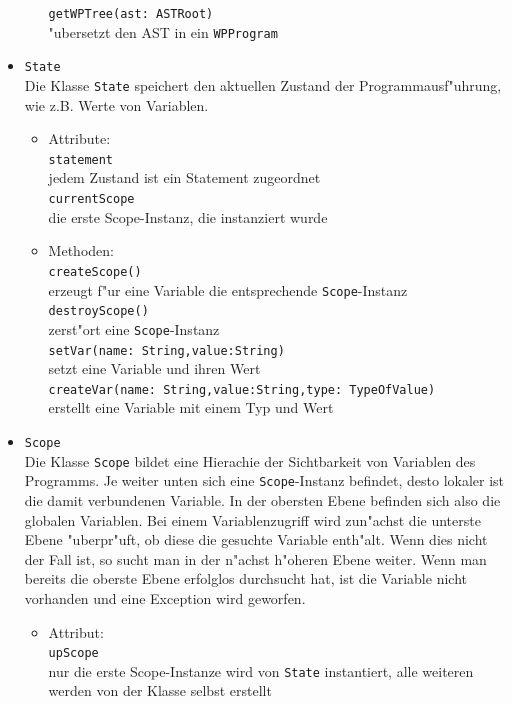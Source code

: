 \documentclass[10pt,a4paper,titlepage]{article}
\begin{document}
\begin{itemize}
\begin{itemize}
\texttt{getWPTree(ast: ASTRoot)} \\
"ubersetzt den AST in ein \texttt{WPProgram}
\end{itemize}
\item \texttt{State} \\
Die Klasse \texttt{State} speichert den aktuellen Zustand der Programmausf"uhrung, wie z.B. Werte von Variablen.
\begin{itemize}
\item Attribute: \\
\texttt{statement} \\
jedem Zustand ist ein Statement zugeordnet \\
\texttt{currentScope} \\
die erste Scope-Instanz, die instanziert wurde
\item Methoden: \\
\texttt{createScope()} \\
erzeugt f"ur eine Variable die entsprechende \texttt{Scope}-Instanz \\
\texttt{destroyScope()} \\
zerst"ort eine \texttt{Scope}-Instanz \\
\texttt{setVar(name: String,value:String)}  \\
setzt eine Variable und ihren Wert \\
\texttt{createVar(name: String,value:String,type: TypeOfValue)} \\
erstellt eine Variable mit einem Typ und Wert
\end{itemize}
\item \texttt{Scope} \\
Die Klasse \texttt{Scope} bildet eine Hierachie der Sichtbarkeit von Variablen des Programms. Je weiter unten sich eine \texttt{Scope}-Instanz befindet, desto lokaler ist die damit verbundenen Variable. In der obersten Ebene befinden sich also die globalen Variablen. Bei einem Variablenzugriff wird zun"achst die unterste Ebene "uberpr"uft, ob diese die gesuchte Variable enth"alt. Wenn dies nicht der Fall ist, so sucht man in der n"achst h"oheren Ebene weiter. Wenn man bereits die oberste Ebene erfolglos durchsucht hat, ist die Variable nicht vorhanden und eine Exception wird geworfen. 
\begin{itemize}
\item Attribut: \\
\texttt{upScope} \\
nur die erste Scope-Instanze wird von \texttt{State} instantiert, alle weiteren werden von der Klasse selbst erstellt \\

\end{itemize}
\end{itemize}
\end{document}
